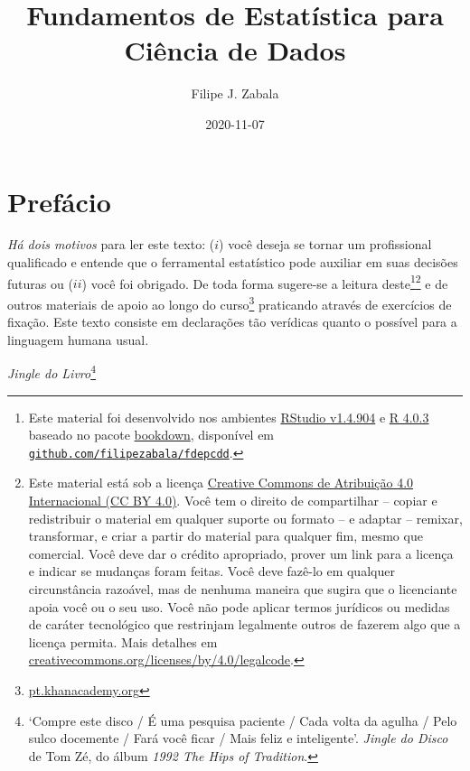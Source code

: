 \documentclass[
]{book}
\title{Fundamentos de Estatística para Ciência de Dados}
\author{Filipe J. Zabala}
\date{2020-11-07}
\theoremstyle{definition}
\theoremstyle{definition}
\theoremstyle{definition}
\theoremstyle{remark}
\begin{document}
\maketitle

{
\setcounter{tocdepth}{1}
\tableofcontents
}
\hypertarget{prefuxe1cio}{%
\chapter*{Prefácio}\label{prefuxe1cio}}

\emph{Há dois motivos} para ler este texto: (\(i\)) você deseja se tornar um profissional qualificado e entende que o ferramental estatístico pode auxiliar em suas decisões futuras ou (\(ii\)) você foi obrigado. De toda forma sugere-se a leitura deste\footnote{Este material foi desenvolvido nos ambientes \href{https://www.rstudio.com/products/rstudio/download/preview/}{RStudio v1.4.904} e \href{https://www.r-project.org/}{R 4.0.3} baseado no pacote \href{https://bookdown.org/}{bookdown}, disponível em \href{https://github.com/filipezabala/fdepcdd}{\texttt{github.com/filipezabala/fdepcdd}}.}\footnote{Este material está sob a licença \href{https://creativecommons.org/licenses/by/4.0/deed.pt_BR}{Creative Commons de Atribuição 4.0 Internacional (CC BY 4.0)}. Você tem o direito de compartilhar -- copiar e redistribuir o material em qualquer suporte ou formato -- e adaptar -- remixar, transformar, e criar a partir do material para qualquer fim, mesmo que comercial. Você deve dar o crédito apropriado, prover um link para a licença e indicar se mudanças foram feitas. Você deve fazê-lo em qualquer circunstância razoável, mas de nenhuma maneira que sugira que o licenciante apoia você ou o seu uso. Você não pode aplicar termos jurídicos ou medidas de caráter tecnológico que restrinjam legalmente outros de fazerem algo que a licença permita. Mais detalhes em \href{https://creativecommons.org/licenses/by/4.0/legalcode}{creativecommons.org/licenses/by/4.0/legalcode}.} e de outros materiais de apoio ao longo do curso\footnote{\href{https://pt.khanacademy.org}{pt.khanacademy.org}} praticando através de exercícios de fixação. Este texto consiste em declarações tão verídicas quanto o possível para a linguagem humana usual.

\emph{Jingle do Livro}\footnote{`Compre este disco / É uma pesquisa paciente / Cada volta da agulha / Pelo sulco docemente / Fará você ficar / Mais feliz e inteligente'. \emph{Jingle do Disco} de Tom Zé, do álbum \emph{1992 The Hips of Tradition}.}
\end{document}
